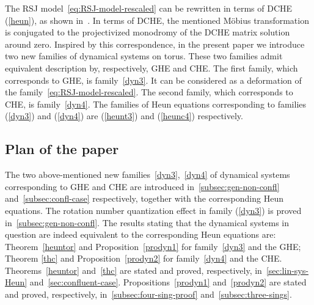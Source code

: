\documentclass[preprint,12pt]{elsarticle}
\theoremstyle{plain}
\numberwithin{equation}{section}
\numberwithin{equation}{section}
\begin{document}
The RSJ model~\eqref{eq:RSJ-model-rescaled} can be rewritten in terms of DCHE (\ref{heun}), as shown in~\cite{buchstaber2017monodromy,buchstaber2013explicit,buchstaber2015holomorphic}. In terms of DCHE, the mentioned M\"{o}bius transformation is conjugated to the projectivized monodromy of the DCHE matrix solution around zero. Inspired by this correspondence, in the present paper we introduce two new families of dynamical systems on torus. These two families admit equivalent description by, respectively, GHE and CHE. The first family, which corresponds to GHE, is family~\eqref{dyn3}. It can be considered as a deformation of the family~\eqref{eq:RSJ-model-rescaled}. The second family, which corresponds to CHE, is family~\eqref{dyn4}. The  families of Heun equations corresponding to families (\ref{dyn3}) and (\ref{dyn4}) are  (\ref{heunt3}) and (\ref{heunc4}) respectively.

\subsection{Plan of the paper}\label{subsec:main-results}

The two above-mentioned new families~\eqref{dyn3},~\eqref{dyn4} of dynamical systems corresponding to GHE and CHE are introduced in~\autoref{subsec:gen-non-confl} and~\autoref{subsec:confl-case} respectively, together with the corresponding Heun equations. The rotation number quantization effect in family (\ref{dyn3}) is proved in~\autoref{subsec:gen-non-confl}. The results stating that the dynamical systems in question are indeed equivalent to the corresponding Heun equations are: Theorem~\ref{heuntor} and Proposition~\ref{prodyn1} for family~\eqref{dyn3} and the GHE; Theorem \ref{thc} and Proposition~\ref{prodyn2} for family~\eqref{dyn4} and the CHE. Theorems~\ref{heuntor} and~\ref{thc} are stated and proved, respectively, in~\autoref{sec:lin-sys-Heun} and~\autoref{sec:confluent-case}. Propositions~\ref{prodyn1} and~\ref{prodyn2} are stated and proved, respectively, in~\autoref{subsec:four-sing-proof} and~\autoref{subsec:three-sings}. 
\end{document}
